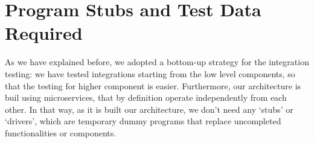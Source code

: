 \section{Program Stubs and Test Data Required}


As we have explained before, we adopted a bottom-up strategy for the integration testing: we have tested integrations starting from the low level components, so that the testing for higher component is easier. Furthermore, our architecture is buil using microservices, that by definition operate independently from each other. In that way, as it is built our architecture, we don't need any `stubs' or `drivers', which are temporary dummy programs that replace uncompleted functionalities or components.

